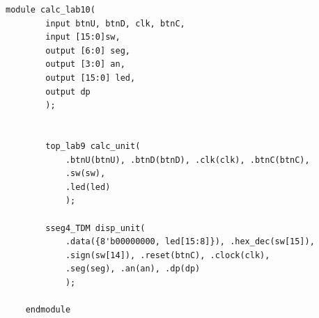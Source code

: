 \documentclass[11pt]{article}
\begin{document}
\clearpage
\begin{lstlisting}[style=Verilog,
caption=CalcLab10,
label=MUX2 Test
]
	module calc_lab10(
		input btnU, btnD, clk, btnC,
		input [15:0]sw,
		output [6:0] seg,
		output [3:0] an,
		output [15:0] led,
		output dp
		);
	
	
		top_lab9 calc_unit(
			.btnU(btnU), .btnD(btnD), .clk(clk), .btnC(btnC),
			.sw(sw),
			.led(led)
			);
		
		sseg4_TDM disp_unit(
			.data({8'b00000000, led[15:8]}), .hex_dec(sw[15]),
			.sign(sw[14]), .reset(btnC), .clock(clk),
			.seg(seg), .an(an), .dp(dp)
			);
	
	endmodule
\end{lstlisting}
\end{document}
